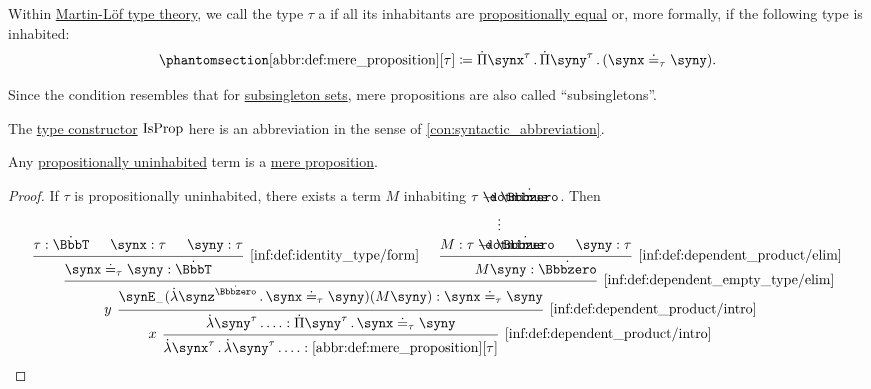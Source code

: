 \begin{definition}\label{def:mere_proposition}
  Within \hyperref[def:mltt]{Martin-L\"of type theory}, we call the type \( \tau \) a  if all its inhabitants are \hyperref[def:mltt_propositional_equality]{propositionally equal} or, more formally, if the following type is inhabited:
  \begin{equation*}\taglabel[\op{IsProp}]{abbr:def:mere_proposition}
    \ref{abbr:def:mere_proposition}[\tau] \coloneqq \qprod {\synx^\tau} \qprod {\syny^\tau} (\synx \syneq_\tau \syny).
  \end{equation*}
\end{definition}
\begin{comments}
  \item Since the condition resembles that for \hyperref[def:subsingleton_set]{subsingleton sets}, mere propositions are also called \enquote{subsingletons}.

  \item The \hyperref[con:type_constructor]{type constructor} \( \op{IsProp} \) here is an abbreviation in the sense of \cref{con:syntactic_abbreviation}.
\end{comments}

\begin{proposition}\label{thm:uninhabited_type_is_proposition}
  Any \hyperref[def:propositionally_uninhabited]{propositionally uninhabited} term is a \hyperref[def:mere_proposition]{mere proposition}.
\end{proposition}
\begin{proof}
  If \( \tau \) is propositionally uninhabited, there exists a term \( M \) inhabiting \( \tau \synimplies \syn\Bbbzero \). Then
  \begin{equation*}
    \begin{prooftree}
      \hypo{ \tau: \syn\BbbT }
      \hypo{ \synx: \tau }
      \hypo{ \syny: \tau }
      \infer3[\ref{inf:def:identity_type/form}]{ \synx \syneq_\tau \syny: \syn\BbbT }

      \hypo {}
      \ellipsis {} { M: \tau \synimplies \syn\Bbbzero }

      \hypo{ \syny: \tau }
      \infer2[\ref{inf:def:dependent_product/elim}]{ M \syny: \syn\Bbbzero }

      \infer2[\ref{inf:def:dependent_empty_type/elim}]{ \synE_- (\qabs {\synz^{\syn\Bbbzero}} \synx \syneq_\tau \syny) (M \syny): \synx \syneq_\tau \syny }
      \infer[left label=\( y \)]1[\ref{inf:def:dependent_product/intro}]{ \qabs {\syny^\tau} \ldots: \qprod {\syny^\tau} \synx \syneq_\tau \syny }
      \infer[left label=\( x \)]1[\ref{inf:def:dependent_product/intro}]{ \qabs {\synx^\tau} \qabs {\syny^\tau} \ldots: \ref{abbr:def:mere_proposition}[\tau] }
    \end{prooftree}
  \end{equation*}
\end{proof}

